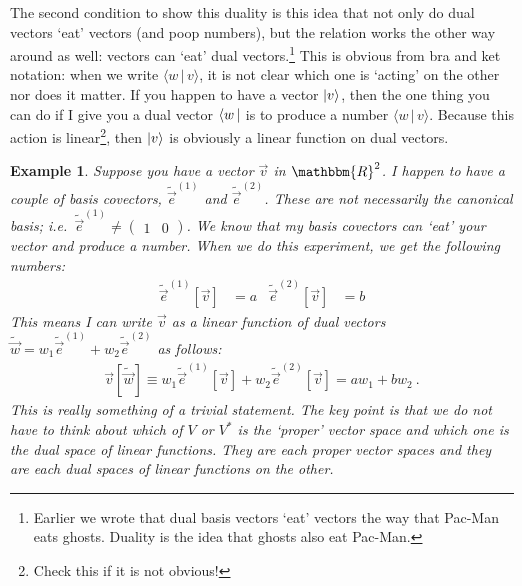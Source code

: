 \documentclass[
  11pt,
	colorful,
	raggedright,
]{tufte-style-thesis-flip}
\newtheorem{example}{Example}[section]
\begin{document}
The second condition to show this duality is this idea that not only do dual vectors `eat' vectors (and poop numbers), but the relation works the other way around as well: vectors can `eat' dual vectors.\footnote{Earlier we wrote that dual basis vectors `eat' vectors the way that Pac-Man eats ghosts. Duality is the idea that ghosts also eat Pac-Man.} This is obvious from bra and ket notation: when we write $\langle w\,|\, v\rangle$, it is not clear which one is `acting' on the other nor does it matter. If you happen to have a vector $\left|v\right\rangle$, then the one thing you can do if I give you a dual vector $\left\langle w\,\right|$ is to produce a  number $\langle w\,|\,v\rangle$. Because this action is linear\footnote{Check this if it is not obvious!}, then $\left|v\right\rangle$ is obviously a linear function on dual vectors. 
\begin{example}
Suppose you have a vector $\vec{v}$ in $\mathbbm{R}^2$.
I happen to have a couple of basis covectors, $\tilde{\vec{e}}^{(1)}$ and $\tilde{\vec{e}}^{(2)}$. These are not necessarily the canonical basis; i.e.\ $\tilde{\vec{e}}^{(1)} \neq \begin{pmatrix}
  1 & 0
\end{pmatrix}$. We know that my basis covectors can `eat' your vector and produce a number. When we do this experiment, we get the following numbers:
\begin{align}
  \tilde{\vec{e}}^{(1)}\left[\vec{v}\right]  &= a
  &
  \tilde{\vec{e}}^{(2)}\left[\vec{v}\right]  &= b
\end{align}
This means I can write $\vec{v}$ as a linear function of dual vectors $\tilde{\vec{w}} = w_1\tilde{\vec{e}}^{(1)}+ w_2\tilde{\vec{e}}^{(2)}$ as follows:
\begin{align}
  \vec{v}\left[\tilde{\vec{w}}\right] \equiv
  w_1\tilde{\vec{e}}^{(1)}\left[\vec{v}\right]
  + 
  w_2\tilde{\vec{e}}^{(2)}\left[\vec{v}\right]
  = 
  aw_1 + bw_2 \ .
\end{align}
This is really something of a trivial statement. The key point is that we do not have to think about which of $V$ or $V^*$ is the `proper' vector space and which one is the dual space of linear functions. They are each proper vector spaces and they are each dual spaces of linear functions on the other.
\end{example}
\end{document}
